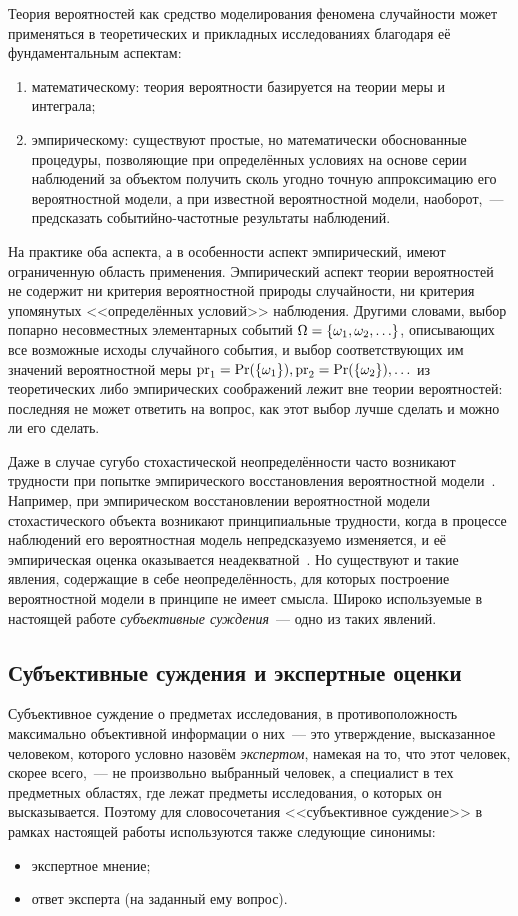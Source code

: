 Теория вероятностей как средство моделирования феномена случайности может применяться в теоретических и прикладных исследованиях благодаря её фундаментальным аспектам:
\begin{enumerate}
  \item математическому: теория вероятности базируется на теории меры и интеграла;
  \item эмпирическому: существуют простые, но математически обоснованные процедуры, позволяющие при определённых условиях
на основе серии наблюдений за объектом получить сколь угодно точную аппроксимацию его вероятностной модели, а при известной вероятностной модели, наоборот,~--- предсказать событийно-частотные результаты наблюдений. 
\end{enumerate}

На практике оба аспекта, а в особенности аспект эмпирический, имеют ограниченную область применения.  Эмпирический аспект теории вероятностей не содержит ни критерия вероятностной природы случайности, ни критерия упомянутых <<определённых условий>> наблюдения. Другими словами, выбор попарно несовместных элементарных событий $\Omega = \{\omega_1, \omega_2, \ldots\}$, описывающих все возможные исходы случайного события, и выбор соответствующих им значений вероятностной меры ${\mathrm{pr}}_1 = {\mathrm{Pr}}(\{\omega_1\}), {\mathrm{pr}}_2 = {\mathrm{Pr}}(\{\omega_2\}), \ldots$ из теоретических либо эмпирических соображений лежит вне теории вероятностей: последняя не может ответить на вопрос, как этот выбор лучше сделать и можно ли его сделать.

Даже в случае сугубо стохастической неопределённости часто возникают трудности при попытке эмпирического восстановления вероятностной модели~\cite{pytstrange}. Например, при эмпирическом восстановлении вероятностной модели стохастического объекта возникают принципиальные трудности, когда в процессе наблюдений его вероятностная модель непредсказуемо изменяется, и её эмпирическая оценка оказывается неадекватной~\cite{pyt2013}. Но существуют и такие явления, содержащие в себе неопределённость, для которых построение вероятностной модели в принципе не имеет смысла. Широко используемые в настоящей работе {\sl субъективные суждения}~--- одно из таких явлений. 

\subsection{Субъективные суждения и экспертные оценки}
\label{sec:intro_subjective}

Субъективное суждение о предметах исследования, в противоположность максимально объективной информации о них~--- это утверждение, высказанное человеком, которого  условно назовём {\sl экспертом}, намекая на то, что этот человек, скорее всего,~--- не произвольно выбранный человек, а специалист в тех предметных областях, где лежат предметы исследования, о которых он высказывается. Поэтому для словосочетания <<субъективное суждение>> в рамках настоящей работы используются также следующие синонимы: 
\begin{itemize}
	\item экспертное мнение;
	\item ответ эксперта (на заданный ему вопрос). 
 \end{itemize}
 
